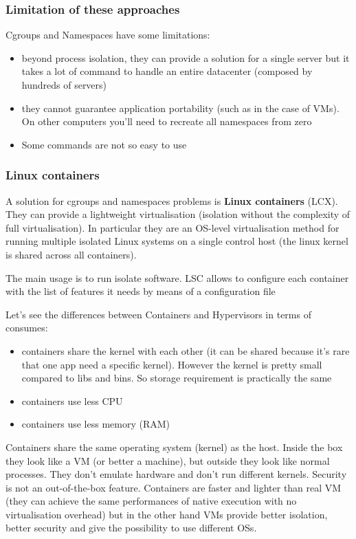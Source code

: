 \subsubsection{Limitation of these approaches}
Cgroups and Namespaces have some limitations:
\begin{itemize}
    \item beyond process isolation, they can provide a solution for a single server but it takes a lot of command to handle an entire datacenter (composed by hundreds of servers)
    \item they cannot guarantee application portability (such as in the case of VMs). On other computers you'll need to recreate all namespaces from zero
    \item Some commands are not so easy to use
\end{itemize}

\subsubsection{Linux containers}
A solution for cgroups and namespaces problems is \textbf{Linux containers} (LCX). They can provide a lightweight virtualisation (isolation without the complexity of full virtualisation). 
In particular they are an OS-level virtualisation method for running multiple isolated Linux systems on a single control host (the linux kernel is shared across all containers).

The main usage is to run isolate software. LSC allows to configure each container with the list of features it needs by means of a configuration file

Let's see the differences between Containers and Hypervisors in terms of consumes:
\begin{itemize}
    \item containers share the kernel with each other (it can be shared because it's rare that one app need a specific kernel). However the kernel is pretty small compared to libs and bins. So storage requirement is practically the same
    \item containers use less CPU
    \item containers use less memory (RAM)
\end{itemize}

Containers share the same operating system (kernel) as the host. Inside the box they look like a VM (or better a machine), but outside they look like normal processes. They don't emulate hardware and don't run different kernels. Security is not an out-of-the-box feature. Containers are faster and lighter than real VM (they can achieve the same performances of native execution with no virtualisation overhead) but in the other hand VMs provide better isolation, better security and give the possibility to use different OSs.

